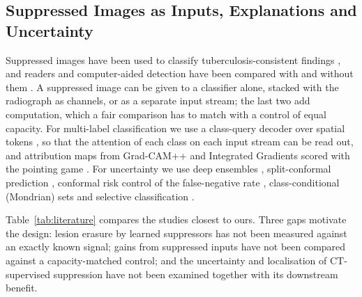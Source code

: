 \subsection{Suppressed Images as Inputs, Explanations and Uncertainty}
Suppressed images have been used to classify tuberculosis-consistent findings \cite{rajaraman2021bone}, and readers and computer-aided
detection have been compared with and without them \cite{freedman2011lung,schalekamp2014cad}. A suppressed image can be given to a
classifier alone, stacked with the radiograph as channels, or as a separate input stream; the last two add computation, which a fair
comparison has to match with a control of equal capacity. For multi-label classification we use a class-query decoder over spatial tokens
\cite{liu2021query2label,ridnik2023mldecoder}, so that the attention of each class on each input stream can be read out, and attribution
maps from Grad-CAM++ \cite{chattopadhay2018gradcampp} and Integrated Gradients \cite{sundararajan2017axiomatic} scored with the pointing
game \cite{zhang2018topdown}. For uncertainty we use deep ensembles \cite{lakshminarayanan2017ensembles}, split-conformal prediction
\cite{lei2018conformal,angelopoulos2023conformal}, conformal risk control of the false-negative rate \cite{angelopoulos2022crc},
class-conditional (Mondrian) sets \cite{vovk2005algorithmic} and selective classification \cite{geifman2017selective,geifman2019bias}.

Table~\ref{tab:literature} compares the studies closest to ours. Three gaps motivate the design: lesion erasure by learned suppressors
has not been measured against an exactly known signal; gains from suppressed inputs have not been compared against a capacity-matched
control; and the uncertainty and localisation of CT-supervised suppression have not been examined together with its downstream benefit.

